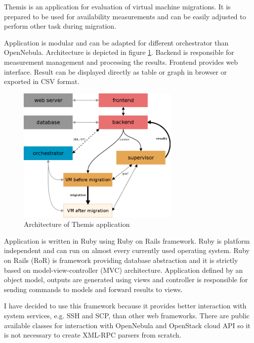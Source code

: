 
Themis is an application for evaluation of virtual machine migrations. It is prepared to be used for availability measurements and can be easily adjusted to perform other task during migration. 

Application is modular and can be adapted for different orchestrator than OpenNebula. Architecture is depicted in figure \ref{img:themis-model}. Backend is responsible for measurement management and processing the results. Frontend provides web interface. Result can be displayed directly as table or graph in browser or exported in \Ac{CSV} format.

\begin{figure}[htb]
	\begin{center}
	\includegraphics[width=0.7\textwidth]{themis-model.png}
	\end{center}
	\caption{Architecture of Themis application}
	\label{img:themis-model}
\end{figure}

Application is written in Ruby using Ruby on Rails framework. Ruby is platform independent and can run on almost every currently used operating system. Ruby on Rails (\Ac{RoR}) is framework providing database abstraction and it is strictly based on model-view-controller (\Ac{MVC}) architecture. Application defined by an object model, outputs are generated using views and controller is responsible for sending commands to models and forward results to views.

I have decided to use this framework because it provides better interaction with system services, e.g. \Ac{SSH} and \Ac{SCP}, than other web frameworks. There are public available classes for interaction with OpenNebula and OpenStack cloud \Ac{API} so it is not necessary to create \mbox{\Ac{XML}-\Ac{RPC}} parsers from scratch.

